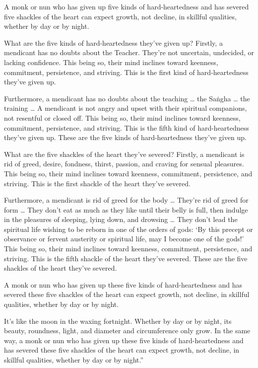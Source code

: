\documentclass[12pt,openany]{book}%
\begin{document}
A monk or nun who has given up five kinds of hard-heartedness and has severed five shackles of the heart can expect growth, not decline, in skillful qualities, whether by day or by night. 

What are the five kinds of hard-heartedness they’ve given up? Firstly, a mendicant has no doubts about the Teacher. They’re not uncertain, undecided, or lacking confidence. This being so, their mind inclines toward keenness, commitment, persistence, and striving. This is the first kind of hard-heartedness they’ve given up. 

Furthermore, a mendicant has no doubts about the teaching … the \textsanskrit{Saṅgha} … the training … A mendicant is not angry and upset with their spiritual companions, not resentful or closed off. This being so, their mind inclines toward keenness, commitment, persistence, and striving. This is the fifth kind of hard-heartedness they’ve given up. These are the five kinds of hard-heartedness they’ve given up. 

What are the five shackles of the heart they’ve severed? Firstly, a mendicant is rid of greed, desire, fondness, thirst, passion, and craving for sensual pleasures. This being so, their mind inclines toward keenness, commitment, persistence, and striving. This is the first shackle of the heart they’ve severed. 

Furthermore, a mendicant is rid of greed for the body … They’re rid of greed for form … They don’t eat as much as they like until their belly is full, then indulge in the pleasures of sleeping, lying down, and drowsing … They don’t lead the spiritual life wishing to be reborn in one of the orders of gods: ‘By this precept or observance or fervent austerity or spiritual life, may I become one of the gods!’ This being so, their mind inclines toward keenness, commitment, persistence, and striving. This is the fifth shackle of the heart they’ve severed. These are the five shackles of the heart they’ve severed. 

A monk or nun who has given up these five kinds of hard-heartedness and has severed these five shackles of the heart can expect growth, not decline, in skillful qualities, whether by day or by night. 

It’s like the moon in the waxing fortnight. Whether by day or by night, its beauty, roundness, light, and diameter and circumference only grow. In the same way, a monk or nun who has given up these five kinds of hard-heartedness and has severed these five shackles of the heart can expect growth, not decline, in skillful qualities, whether by day or by night.” 
\end{document}
